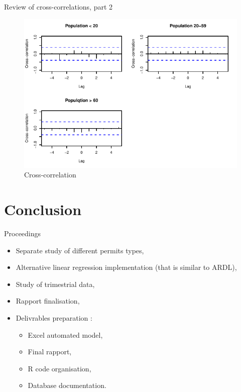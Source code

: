 \documentclass[11pt,ignorenonframetext,]{beamer}
\providecommand{\tightlist}{%
  \setlength{\itemsep}{0pt}\setlength{\parskip}{0pt}}
\begin{document}
\begin{frame}{Review of cross-correlations, part 2}
\protect\hypertarget{review-of-cross-correlations-part-2}{}

\FloatBarrier

\tiny

\begin{figure}[!htbp]

{\centering \includegraphics{presentation_files/figure-beamer/unnamed-chunk-40-1} 

}

\caption{Cross-correlation}\label{fig:unnamed-chunk-40}
\end{figure}

\normalsize

\FloatBarrier

\end{frame}

\hypertarget{conclusion}{%
\section{Conclusion}\label{conclusion}}

\begin{frame}{Proceedings}
\protect\hypertarget{proceedings}{}

\begin{itemize}
\tightlist
\item
  Separate study of different permits types,
\item
  Alternative linear regression implementation (that is similar to
  ARDL),
\item
  Study of trimestrial data,
\item
  Rapport finalisation,
\item
  Delivrables preparation :

  \begin{itemize}
  \tightlist
  \item
    Excel automated model,
  \item
    Final rapport,
  \item
    R code organisation,
  \item
    Database documentation.
  \end{itemize}
\end{itemize}

\end{frame}
\end{document}
